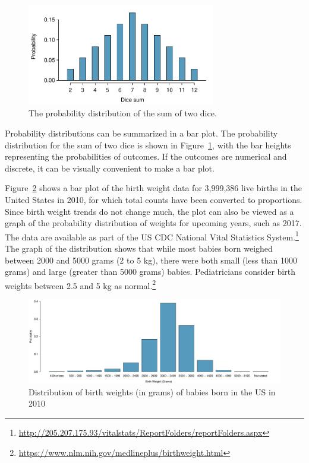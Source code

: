 \begin{figure}[h]
\centering
\includegraphics[width=0.73\textwidth]{ch_probability_oi_biostat/figures/diceSumDist/diceSumDist}
\caption{The probability distribution of the sum of two dice.}
\label{diceSumDist}
\end{figure}

Probability distributions can be summarized in a bar plot. The probability distribution for the sum of two dice is shown in Figure~\ref{diceSumDist}, with the bar heights representing the probabilities of outcomes. If the outcomes are numerical and discrete, it can be visually convenient to make a bar plot.  

Figure~\ref{fig:birthwtMarginalDist} shows a bar plot of the birth weight data for 3,999,386 live births in the United States in 2010, for which total counts have been converted to proportions. Since birth weight trends do not change much, the plot can also be viewed as a graph of the probability distribution of weights for upcoming years, such as 2017. The data are available as part of the US CDC National Vital Statistics System.\footnote{\url{http://205.207.175.93/vitalstats/ReportFolders/reportFolders.aspx}} The graph of the distribution shows that while most babies born weighed between 2000 and 5000 grams (2 to 5 kg), there were both small (less than 1000 grams) and large (greater than 5000 grams) babies. Pediatricians consider birth weights between 2.5 and 5 kg as normal.\footnote{\url{https://www.nlm.nih.gov/medlineplus/birthweight.html}}


\begin{figure}[h]
	\includegraphics[width=\textwidth]{ch_probability_oi_biostat/figures/birthwtMarginalDist/birthwtMarginalDist.pdf}
	\caption{Distribution of birth weights (in grams) of babies born in the US in 2010}
	\label{fig:birthwtMarginalDist}
\end{figure}

